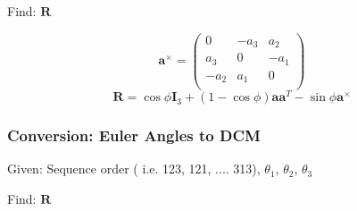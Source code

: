 \noindent Find: $\mathbf{R}$

\begin{equation}
     \mathbf{a}^{\times} = \begin{pmatrix}
     0 & -a_3 & a_2\\
     a_3 & 0 & -a_1\\
     -a_2 & a_1 & 0\\
     \end{pmatrix}
\end{equation}
%
\begin{equation}
    \mathbf{R} = \cos{\phi}\mathbf{I}_3 + (1 -
    \cos{\phi})\mathbf{a}\mathbf{a}^T -
    \sin{\phi}\mathbf{a}^{\times}
\end{equation}

\subsubsection{Conversion:  Euler Angles to DCM}
\label{sec:AttEulerAnglestoDCM}

Given:  Sequence order  ( i.e. 123, 121, .... 313),  $\theta_1$,
$\theta_2$, $\theta_3$

\noindent Find: $\mathbf{R}$

